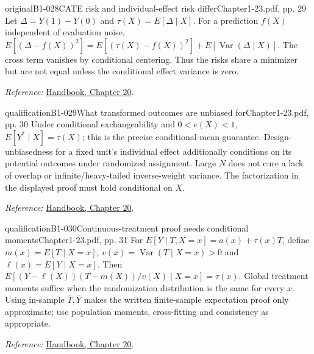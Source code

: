 {\begin{reviewnote}{original}{B1-028}{CATE risk and individual-effect risk differ}{Chapter1-23.pdf, pp. 29}
Let $\Delta=Y(1)-Y(0)$ and $\tau(X)=E[\Delta\mid X]$. For a prediction $f(X)$ independent of evaluation noise, $E[(\Delta-f(X))^2]=E[(\tau(X)-f(X))^2]+E[\operatorname{Var}(\Delta\mid X)]$. The cross term vanishes by conditional centering. Thus the risks share a minimizer but are not equal unless the conditional effect variance is zero.
\par\smallskip\textit{Reference:} \href{https://matheusfacure.github.io/python-causality-handbook/20-Plug-and-Play-Estimators.html}{Handbook, Chapter 20}.
\end{reviewnote}

\begin{reviewnote}{qualification}{B1-029}{What transformed outcomes are unbiased for}{Chapter1-23.pdf, pp. 30}
Under conditional exchangeability and $0<e(X)<1$, $E[Y^*\mid X]=\tau(X)$; this is the precise conditional-mean guarantee. Design-unbiasedness for a fixed unit's individual effect additionally conditions on its potential outcomes under randomized assignment. Large $N$ does not cure a lack of overlap or infinite/heavy-tailed inverse-weight variance. The factorization in the displayed proof must hold conditional on $X$.
\par\smallskip\textit{Reference:} \href{https://matheusfacure.github.io/python-causality-handbook/20-Plug-and-Play-Estimators.html}{Handbook, Chapter 20}.
\end{reviewnote}

\begin{reviewnote}{qualification}{B1-030}{Continuous-treatment proof needs conditional moments}{Chapter1-23.pdf, pp. 31}
For $E[Y\mid T,X=x]=a(x)+\tau(x)T$, define $m(x)=E[T\mid X=x]$, $v(x)=\operatorname{Var}(T\mid X=x)>0$ and $\ell(x)=E[Y\mid X=x]$. Then $E[(Y-\ell(X))(T-m(X))/v(X)\mid X=x]=\tau(x)$. Global treatment moments suffice when the randomization distribution is the same for every $x$. Using in-sample $\bar T,\bar Y$ makes the written finite-sample expectation proof only approximate; use population moments, cross-fitting and consistency as appropriate.
\par\smallskip\textit{Reference:} \href{https://matheusfacure.github.io/python-causality-handbook/20-Plug-and-Play-Estimators.html}{Handbook, Chapter 20}.
\end{reviewnote}

}
